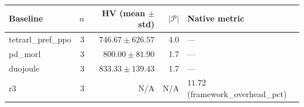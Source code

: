\begin{tabular}{lrrrl}
\toprule
Baseline & $n$ & HV (mean $\pm$ std) & $|\mathcal{P}|$ & Native metric \\
\midrule
tetrarl\_pref\_ppo & 3 & $746.67 \pm 626.57$ & 4.0 & --- \\
pd\_morl & 3 & $800.00 \pm 81.90$ & 1.7 & --- \\
duojoule & 3 & $833.33 \pm 139.43$ & 1.7 & --- \\
r3 & 3 & N/A & N/A & $11.72$ (framework\_overhead\_pct) \\
\bottomrule
\end{tabular}
